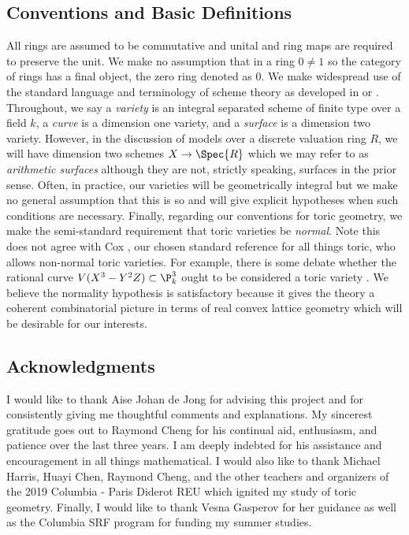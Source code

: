 \documentclass[12pt]{article}
\begin{document}
\subsection{Conventions and Basic Definitions}

All rings are assumed to be commutative and unital and ring maps are required to preserve the unit. We make no assumption that in a ring $0 \neq 1$ so the category of rings has a final object, the zero ring denoted as $0$. We make widespread use of the standard language and terminology of scheme theory as developed in \cite{har} or \cite{EGA}. Throughout, we say a \textit{variety} is an integral separated scheme of finite type over a field $k$, a \textit{curve} is a dimension one variety, and a \textit{surface} is a dimension two variety. However, in the discussion of models over a discrete valuation ring $R$, we will have dimension two schemes $X \to \Spec{R}$ which we may refer to as \textit{arithmetic surfaces} although they are not, strictly speaking, surfaces in the prior sense. Often, in practice, our varieties will be geometrically integral but we make no general assumption that this is so and will give explicit hypotheses when such conditions are necessary. Finally, regarding our conventions for toric geometry, we make the semi-standard requirement that toric varieties be \textit{normal}. Note this does not agree with Cox \cite{cox, cox_lectures}, our chosen standard reference for all things toric, who allows non-normal toric varieties. For example, there is some debate whether the rational curve $V(X^3 - Y^2 Z) \subset \P^3_k$ ought to be considered a toric variety \cite[Lec. 1, Ex. 1.4]{cox_lectures}. We believe the normality hypothesis is satisfactory because it gives the theory a coherent combinatorial picture in terms of real convex lattice geometry which will be desirable for our interests.

\subsection{Acknowledgments}

I would like to thank Aise Johan de Jong for advising this project and for consistently giving me thoughtful comments and explanations. My sincerest gratitude goes out to Raymond Cheng for his continual aid, enthusiasm, and patience over the last three years. I am deeply indebted for his assistance and encouragement in all things mathematical. I would also like to thank Michael Harris, Huayi Chen, Raymond Cheng, and the other teachers and organizers of the 2019 Columbia - Paris Diderot REU which ignited my study of toric geometry. Finally, I would like to thank Vesna Gasperov for her guidance as well as the Columbia SRF program for funding my summer studies. 

\tableofcontents
\newpage












\end{document}
